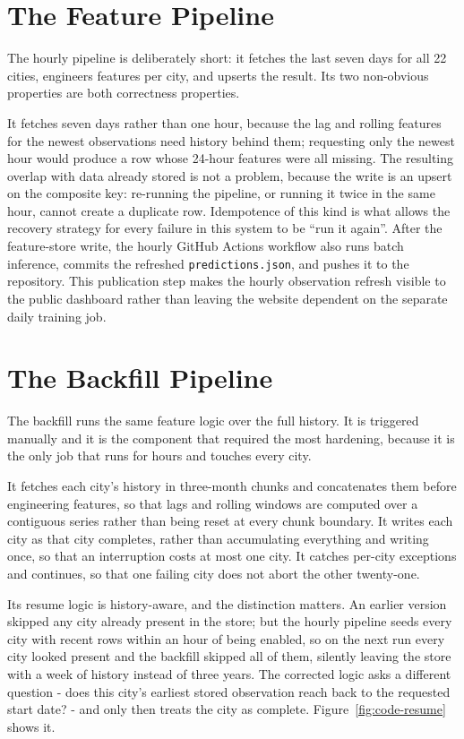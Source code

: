 \section{The Feature Pipeline}
\label{sec:impl-feature-pipeline}
The hourly pipeline is deliberately short: it fetches the last seven days for all
22 cities, engineers features per city, and upserts the result. Its two
non-obvious properties are both correctness properties.

It fetches seven days rather than one hour, because the lag and rolling features
for the newest observations need history behind them; requesting only the newest
hour would produce a row whose 24-hour features were all missing. The resulting
overlap with data already stored is not a problem, because the write is an upsert
on the composite key: re-running the pipeline, or running it twice in the same
hour, cannot create a duplicate row. Idempotence of this kind is what allows the
recovery strategy for every failure in this system to be ``run it again''. After
the feature-store write, the hourly GitHub Actions workflow also runs batch
inference, commits the refreshed \texttt{predictions.json}, and pushes it to the
repository. This publication step makes the hourly observation refresh visible
to the public dashboard rather than leaving the website dependent on the separate
daily training job.

\section{The Backfill Pipeline}
The backfill runs the same feature logic over the full history. It is triggered
manually and it is the component that required the most hardening, because it is
the only job that runs for hours and touches every city.

It fetches each city's history in three-month chunks and concatenates them before
engineering features, so that lags and rolling windows are computed over a
contiguous series rather than being reset at every chunk boundary. It writes each
city as that city completes, rather than accumulating everything and writing once,
so that an interruption costs at most one city. It catches per-city exceptions and
continues, so that one failing city does not abort the other twenty-one.

Its resume logic is history-aware, and the distinction matters. An earlier version
skipped any city already present in the store; but the hourly pipeline seeds every
city with recent rows within an hour of being enabled, so on the next run every
city looked present and the backfill skipped all of them, silently leaving the
store with a week of history instead of three years. The corrected logic asks a
different question - does this city's earliest stored observation reach back to
the requested start date? - and only then treats the city as complete.
Figure~\ref{fig:code-resume} shows it.

